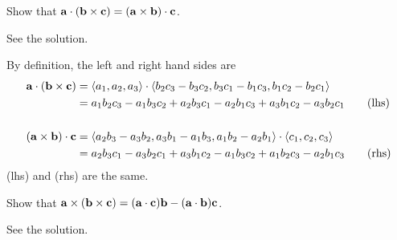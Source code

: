 \begin{question}
Show that $\mathbf{a}\cdot(\mathbf{b}\times\mathbf{c})
                         =(\mathbf{a}\times\mathbf{b})\cdot\mathbf{c}$.
\end{question}


\begin{answer}
See the solution.
\end{answer}

\begin{solution} By definition, the left and right hand sides are
\begin{align}
\mathbf{a}\cdot(\mathbf{b}\times\mathbf{c})
&=\left< a_1,a_2,a_3\right> \cdot\left< b_2c_3-b_3c_2, b_3c_1-b_1c_3, b_1c_2-b_2c_1\right> \notag\\
&=a_1b_2c_3 - a_1b_3c_2 + a_2b_3c_1 - a_2b_1c_3 + a_3b_1c_2 - a_3b_2c_1
\tag{lhs}\\
\notag\\
(\mathbf{a}\times\mathbf{b})\cdot\mathbf{c}
&=\left< a_2b_3-a_3b_2, a_3b_1-a_1b_3, a_1b_2-a_2b_1\right> \cdot\left< c_1,c_2,c_3\right> \notag\\
&=a_2b_3c_1 - a_3b_2c_1 + a_3b_1c_2 - a_1b_3c_2 + a_1b_2c_3 - a_2b_1c_3
\tag{rhs}
\end{align}
(lhs) and (rhs) are the same.
\end{solution}


\begin{question}
Show that $\mathbf{a}\times(\mathbf{b}\times\mathbf{c})
=(\mathbf{a}\cdot\mathbf{c})\mathbf{b}-(\mathbf{a}\cdot\mathbf{b})\mathbf{c}$.
\end{question}


\begin{answer}
See the solution.
\end{answer}

